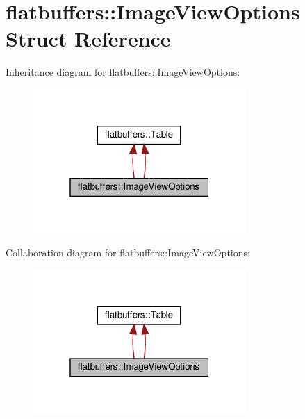 \hypertarget{structflatbuffers_1_1ImageViewOptions}{}\section{flatbuffers\+:\+:Image\+View\+Options Struct Reference}
\label{structflatbuffers_1_1ImageViewOptions}


Inheritance diagram for flatbuffers\+:\+:Image\+View\+Options\+:
\nopagebreak
\begin{figure}[H]
\begin{center}
\leavevmode
\includegraphics[width=229pt]{structflatbuffers_1_1ImageViewOptions__inherit__graph}
\end{center}
\end{figure}


Collaboration diagram for flatbuffers\+:\+:Image\+View\+Options\+:
\nopagebreak
\begin{figure}[H]
\begin{center}
\leavevmode
\includegraphics[width=229pt]{structflatbuffers_1_1ImageViewOptions__coll__graph}
\end{center}
\end{figure}
